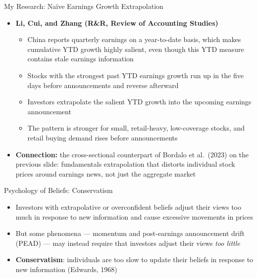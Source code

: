 \documentclass[aspectratio=169, 11pt]{beamer}
\begin{document}
\begin{frame}[shrink=5]{My Research: Na\"ive Earnings Growth Extrapolation}
\begin{itemize}
\item \textbf{Li, Cui, and Zhang (R\&R, Review of Accounting Studies)}
  \begin{itemize}
  \item China reports quarterly earnings on a year-to-date basis, which makes cumulative YTD growth highly salient, even though this YTD measure contains stale earnings information 
  \item Stocks with the strongest past YTD earnings growth run up in the five days before announcements and reverse afterward
  \item Investors extrapolate the salient YTD growth into the upcoming earnings announcement 
  \item The pattern is stronger for small, retail-heavy, low-coverage stocks, and retail buying demand rises before announcements
  \end{itemize}
\item \textbf{Connection:} the cross-sectional counterpart of Bordalo et al.\ (2023) on the previous slide: fundamentals extrapolation that distorts individual stock prices around earnings news, not just the aggregate market
\end{itemize}
\end{frame}

\begin{frame}{Psychology of Beliefs: Conservatism}
\begin{itemize}
\item Investors with extrapolative or overconfident beliefs adjust their views too much in response to new information and cause excessive movements in prices
\item But some phenomena --- momentum and post-earnings announcement drift (PEAD) --- may instead require that investors adjust their views \emph{too little}
\item \textbf{Conservatism}: individuals are too slow to update their beliefs in response to new information (Edwards, 1968)
\end{itemize}
\end{frame}
\end{document}
